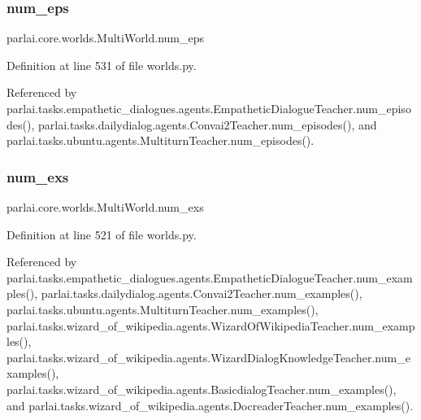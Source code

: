 \subsubsection{\texorpdfstring{num\+\_\+eps}{num\_eps}}
{\footnotesize\ttfamily parlai.\+core.\+worlds.\+Multi\+World.\+num\+\_\+eps}



Definition at line 531 of file worlds.\+py.



Referenced by parlai.\+tasks.\+empathetic\+\_\+dialogues.\+agents.\+Empathetic\+Dialogue\+Teacher.\+num\+\_\+episodes(), parlai.\+tasks.\+dailydialog.\+agents.\+Convai2\+Teacher.\+num\+\_\+episodes(), and parlai.\+tasks.\+ubuntu.\+agents.\+Multiturn\+Teacher.\+num\+\_\+episodes().

\mbox{\label{classparlai_1_1core_1_1worlds_1_1MultiWorld_a97cb387aa6641126af73571731042ece}} 
\subsubsection{\texorpdfstring{num\+\_\+exs}{num\_exs}}
{\footnotesize\ttfamily parlai.\+core.\+worlds.\+Multi\+World.\+num\+\_\+exs}



Definition at line 521 of file worlds.\+py.



Referenced by parlai.\+tasks.\+empathetic\+\_\+dialogues.\+agents.\+Empathetic\+Dialogue\+Teacher.\+num\+\_\+examples(), parlai.\+tasks.\+dailydialog.\+agents.\+Convai2\+Teacher.\+num\+\_\+examples(), parlai.\+tasks.\+ubuntu.\+agents.\+Multiturn\+Teacher.\+num\+\_\+examples(), parlai.\+tasks.\+wizard\+\_\+of\+\_\+wikipedia.\+agents.\+Wizard\+Of\+Wikipedia\+Teacher.\+num\+\_\+examples(), parlai.\+tasks.\+wizard\+\_\+of\+\_\+wikipedia.\+agents.\+Wizard\+Dialog\+Knowledge\+Teacher.\+num\+\_\+examples(), parlai.\+tasks.\+wizard\+\_\+of\+\_\+wikipedia.\+agents.\+Basicdialog\+Teacher.\+num\+\_\+examples(), and parlai.\+tasks.\+wizard\+\_\+of\+\_\+wikipedia.\+agents.\+Docreader\+Teacher.\+num\+\_\+examples().

\mbox{\label{classparlai_1_1core_1_1worlds_1_1MultiWorld_aa4332cdcbb6a8f91d55fbdeaa412cbe3}} 
